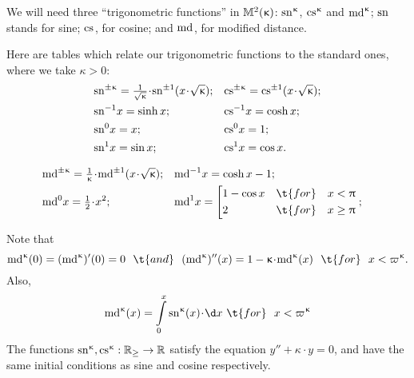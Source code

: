 We will need three ``trigonometric functions'' in $\mathbb{M}_{{}}^{2}({\upkappa})$: $\sn\kappa$, $\cs\kappa$ and $\md\kappa$;
$\mathrm{sn}^{}$ stands for sine; $\mathrm{cs}^{}$,  for cosine; and $\mathrm{md}^{}$, for modified distance.

Here are tables which relate our trigonometric functions to the standard ones, where 
we take $\kappa>0$:\index{$\md\kappa$}\index{$\sn\kappa$}\index{$\cs\kappa$}
\begin{align*}
&\sn{\pm\kappa}=\tfrac{1}{\sqrt{\kappa}}\cdot \sn{\pm1}({x}\cdot {\sqrt{\kappa}});
&&\cs{\pm\kappa}=\cs{\pm1}({x}\cdot {\sqrt{\kappa}});
\\
&\sn{-1} x=\sinh x;&&\cs{-1} x=\cosh x;\\
&\sn{0} x=x;
&&\cs{0} x=1;\\
&\sn{1} x=\sin x;	&&\cs{1} x= \cos x.
\end{align*}
	
\begin{align*}
&\md{\pm\kappa}
=
\tfrac{1}{\kappa}\cdot \md{\pm1}({x}\cdot {\sqrt{\kappa}});
&&\md{-1} x=\cosh x-1;\\
&\md{0} x=\tfrac{1}{2}\cdot x^2; 
&&\md{1} x
=
\left[
\begin{aligned}
&1-\cos x&&\t{for}&&x<\pi
\\
&2&&\t{for}&&x\ge\pi
\end{aligned}
\right.;	&
\end{align*}


Note that
\[\md\kappa(0)=(\md\kappa)'(0)=0\ \ \t{and}\ \ 
(\md\kappa)''(x)=1-\kappa\cdot\md\kappa(x)\ \ \t{for}\ \ x<\varpi\kappa.\]
Also,
\[
\mdk(x)=\int\limits_0^x
\snk(x)\cdot\d x \ \t{ for }\ \ x<\varpi\kappa
\]
The functions $\sn\kappa, \cs\kappa:\RR_{\ge}\to\RR$ satisfy the equation $y''+\kappa\cdot y=0$,  
and have the same initial conditions as sine and cosine respectively.




